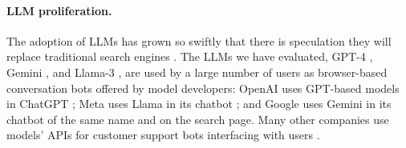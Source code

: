 \begin{table}[!h]
    \centering
    \vspace{-1.0em}
    \setlength{\abovecaptionskip}{0pt}
    \caption{This paper and existing security advice research.}
    
    \label{sec-advice-related-work}
    \vspace{-1.0em}
\end{table}






\paragraph{LLM proliferation.} The adoption of LLMs has grown so swiftly that there is speculation they will replace traditional search engines \cite{pcmag-chatGPT-v-Google}. The LLMs we have evaluated, GPT-4 \cite{openai2024gpt4}, Gemini \cite{geminiteam2024geminiv1.5}, and Llama-3 \cite{Llama3git}, are used by a large number of users \cite{Liu-ai-usage-2024} as browser-based conversation bots offered by model developers: OpenAI uses GPT-based models in ChatGPT \cite{GPT4Research}; Meta uses Llama in its chatbot \cite{MetaLlama3launchblog,}; and Google uses Gemini in its chatbot of the same name \cite{GeminiReleaseBlog} and on the search page. Many other companies use models' APIs for customer support bots interfacing with users \cite{openaistories}. 







